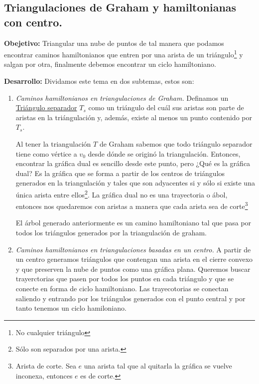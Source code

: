 \subsection[Expositor: Ares Gael Castro Romero.]{Triangulaciones de Graham y hamiltonianas con centro.}
\textbf{Obejetivo:} Triangular una nube de puntos de tal manera que podamos encontrar caminos hamiltonianos
que entren por una arista de un triángulo\footnote{No cualquier triángulo} y salgan por otra, finalmente
debemos encontrar un ciclo hamiltoniano.\newline

\textbf{Desarrollo:} Dividamos este tema en dos subtemas, estos son:
\begin{enumerate}
\item \textit{Caminos hamiltonianos en triangulaciones de Graham.} Definamos un \underline{Triángulo
  separador} $T_s$ como un triángulo del cuál sus aristas son parte de aristas en la triángulación y, además,
  existe al menos un punto contenido por $T_s$.\newline
  
  Al tener la triangulación $T$ de Graham sabemos que todo triángulo separador tiene como vértice a $v_0$ desde
  dónde se originó la triangulación. Entonces, encontrar la gráfica dual es sencillo desde este punto, pero
  ¿Qué es la gráfica dual? Es la gráfica que se forma a partir de los centros de triángulos generados en la
  triangulación y tales que son adyacentes si y sólo si existe una única arista entre ellos\footnote{Sólo son separados
  por una arista.}. La gráfica dual no es una trayectoria o ábol, entonces nos quedaremos con aristas a manera
  que cada arista sea de corte\footnote{Arista de corte. Sea $e$ una arista tal que al quitarla la gráfica se vuelve inconexa,
  entonces $e$ es de corte.} \newline
  
  El árbol generado anteriormente es un camino hamiltoniano tal que pasa por todos los triángulos generados por
  la triangulación de graham.
  
\item \textit{Caminos hamiltonianos en triangulaciones basadas en un centro.} A partir de un centro generamos triángulos
  que contengan una arista en el cierre convexo y que preserven la nube de puntos como una gráfica plana. Queremos buscar
  trayerctorias que pasen por todos los puntos en cada triángulo y que se conecte en forma de ciclo hamiltoniano. Las trayecotorias
  se conectan saliendo y entrando por los triángulos generados con el punto central y por tanto tenemos un ciclo hamiloniano.
\end{enumerate}
